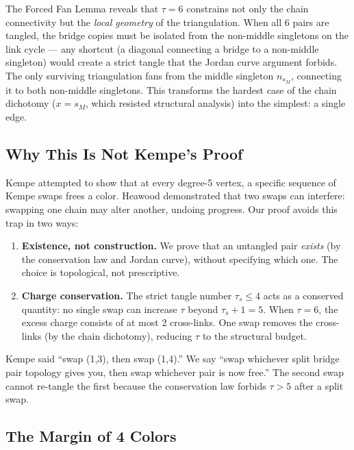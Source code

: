 \documentclass[11pt]{article}
\theoremstyle{remark}
\begin{document}
The Forced Fan Lemma reveals that $\tau = 6$ constrains not only the chain connectivity but the \emph{local geometry} of the triangulation. When all 6 pairs are tangled, the bridge copies must be isolated from the non-middle singletons on the link cycle --- any shortcut (a diagonal connecting a bridge to a non-middle singleton) would create a strict tangle that the Jordan curve argument forbids. The only surviving triangulation fans from the middle singleton $n_{s_M}$, connecting it to both non-middle singletons. This transforms the hardest case of the chain dichotomy ($x = s_M$, which resisted structural analysis) into the simplest: a single edge.

\subsection{Why This Is Not Kempe's Proof}

Kempe \cite{kempe1879} attempted to show that at every degree-5 vertex, a specific sequence of Kempe swaps frees a color. Heawood \cite{heawood1890} demonstrated that two swaps can interfere: swapping one chain may alter another, undoing progress. Our proof avoids this trap in two ways:

\begin{enumerate}[label=\arabic*.]
  \item \textbf{Existence, not construction.} We prove that an untangled pair \emph{exists} (by the conservation law and Jordan curve), without specifying which one. The choice is topological, not prescriptive.

  \item \textbf{Charge conservation.} The strict tangle number $\tau_s \leq 4$ acts as a conserved quantity: no single swap can increase $\tau$ beyond $\tau_s + 1 = 5$. When $\tau = 6$, the excess charge consists of at most 2 cross-links. One swap removes the cross-links (by the chain dichotomy), reducing $\tau$ to the structural budget.
\end{enumerate}

Kempe said ``swap (1,3), then swap (1,4).'' We say ``swap whichever split bridge pair topology gives you, then swap whichever pair is now free.'' The second swap cannot re-tangle the first because the conservation law forbids $\tau > 5$ after a split swap.

\subsection{The Margin of 4 Colors}
\end{document}
